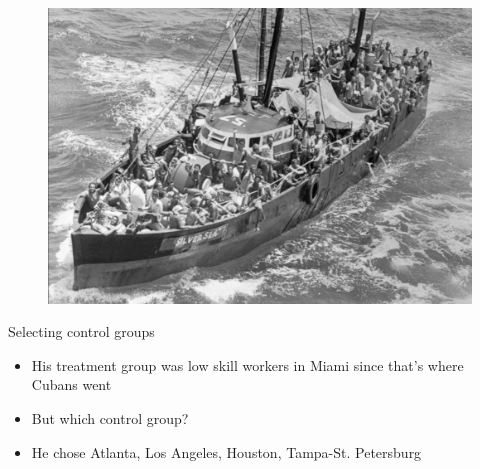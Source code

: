 \documentclass{beamer}
\begin{document}
\begin{frame}[plain]
	\begin{figure}
	\includegraphics[scale=0.25]{./lecture_includes/boatlift4.png}
	\end{figure}
\end{frame}



\begin{frame}{Selecting control groups}

\begin{itemize}

\item His treatment group was low skill workers in Miami since that's where Cubans went
\item But which control group?
\item He chose Atlanta, Los Angeles, Houston, Tampa-St. Petersburg

\end{itemize}

\end{frame}
\end{document}
